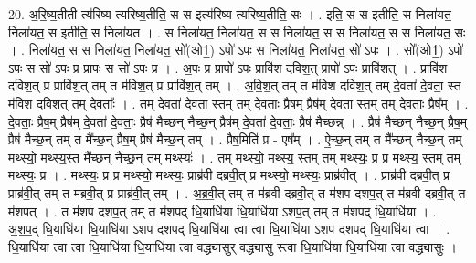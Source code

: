 \documentclass[17pt]{extarticle}
\begin{document}
20. अ॒रि॒ष्य॒तीती त्य॑रिष्य त्यरिष्य॒तीति॒ स स इत्य॑रिष्य त्यरिष्य॒तीति॒ सः । . इति॒ स स इतीति॒ स निला॑यत॒ निला॑यत॒ स इतीति॒ स निला॑यत । . स निला॑यत॒ निला॑यत॒ स स निला॑यत॒ स स निला॑यत॒ स स निला॑यत॒ सः । . निला॑यत॒ स स निला॑यत॒ निला॑यत॒ सो᳚(ओ1॒) ऽपो॑ ऽपः स निला॑यत॒ निला॑यत॒ सो॑ ऽपः । . सो᳚(ओ1॒) ऽपो॑ ऽपः स सो॑ ऽपः प्र प्रापः स सो॑ ऽपः प्र । . अ॒पः प्र प्रापो॑ ऽपः प्रावि॑श दविश॒त् प्रापो॑ ऽपः प्रावि॑शत् । . प्रावि॑श दविश॒त् प्र प्रावि॑श॒त् तम् त म॑विश॒त् प्र प्रावि॑श॒त् तम् । . अ॒वि॒श॒त् तम् त म॑विश दविश॒त् तम् दे॒वता॑ दे॒वता॒ स्त म॑विश दविश॒त् तम् दे॒वताः᳚ । . तम् दे॒वता॑ दे॒वता॒ स्तम् तम् दे॒वताः॒ प्रैष॒म् प्रैष॑म् दे॒वता॒ स्तम् तम् दे॒वताः॒ प्रैष᳚म् । . दे॒वताः॒ प्रैष॒म् प्रैष॑म् दे॒वता॑ दे॒वताः॒ प्रैष॑ मैच्छन् नैच्छ॒न् प्रैष॑म् दे॒वता॑ दे॒वताः॒ प्रैष॑ मैच्छन्न् । . प्रैष॑ मैच्छन् नैच्छ॒न् प्रैष॒म् प्रैष॑ मैच्छ॒न् तम् त मै᳚च्छ॒न् प्रैष॒म् प्रैष॑ मैच्छ॒न् तम् । . प्रैष॒मिति॑ प्र - एष᳚म् । . ऐ॒च्छ॒न् तम् त मै᳚च्छन् नैच्छ॒न् तम् मथ्स्यो॒ मथ्स्य॒स्त मै᳚च्छन् नैच्छ॒न् तम् मथ्स्यः॑ । . तम् मथ्स्यो॒ मथ्स्य॒ स्तम् तम् मथ्स्यः॒ प्र प्र मथ्स्य॒ स्तम् तम् मथ्स्यः॒ प्र । . मथ्स्यः॒ प्र प्र मथ्स्यो॒ मथ्स्यः॒ प्राब्र॑वी दब्रवी॒त् प्र मथ्स्यो॒ मथ्स्यः॒ प्राब्र॑वीत् । . प्राब्र॑वी दब्रवी॒त् प्र प्राब्र॑वी॒त् तम् त म॑ब्रवी॒त् प्र प्राब्र॑वी॒त् तम् । . अ॒ब्र॒वी॒त् तम् त म॑ब्रवी दब्रवी॒त् त म॑शप दशप॒त् त म॑ब्रवी दब्रवी॒त् त म॑शपत् । . त म॑शप दशप॒त् तम् त म॑शपद् धि॒याधि॑या धि॒याधि॑या ऽशप॒त् तम् त म॑शपद् धि॒याधि॑या । . अ॒श॒प॒द् धि॒याधि॑या धि॒याधि॑या ऽशप दशपद् धि॒याधि॑या त्वा त्वा धि॒याधि॑या ऽशप दशपद् धि॒याधि॑या त्वा । . धि॒याधि॑या त्वा त्वा धि॒याधि॑या धि॒याधि॑या त्वा वद्ध्यासुर् वद्ध्यासु स्त्वा धि॒याधि॑या धि॒याधि॑या त्वा वद्ध्यासुः । \newline
\end{document}
